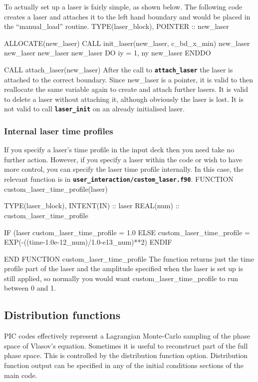 \documentclass[12pt,a4paper]{article}
\newcommand{\inlinecode}[1]{{\color{warwickred} \bf\texttt{#1}}}
\newenvironment{boxverbatim}{\lboxverbatim{none}}{\endlboxverbatim}
\begin{document}
To actually set up a laser is fairly simple, as shown below. The following
code creates a laser and attaches it to the left hand boundary and would
be placed in the ``manual\_load'' routine.
\begin{boxverbatim}
  TYPE(laser_block), POINTER :: new_laser

  ALLOCATE(new_laser)
  CALL init_laser(new_laser, c_bd_x_min)
  new_laser%
  new_laser%
  new_laser%
  new_laser%
  DO iy = 1, ny
    new_laser%
  ENDDO

  CALL attach_laser(new_laser)
\end{boxverbatim}
After the call to \inlinecode{attach\_laser} the laser is attached to the
correct boundary. Since new\_laser is a pointer, it is valid to then reallocate
the same variable again to create and attach further lasers. It is valid to
delete a laser without attaching it, although obviously the laser is lost. It
is not valid to call \inlinecode{laser\_init} on an already initialised laser.

\subsubsection{Internal laser time profiles}
If you specify a laser's time profile in the input deck then you need take no
further action. However, if you specify a laser within the code or wish to
have more control, you can specify the laser time profile internally. In this
case, the relevant function is in
\inlinecode{user\_interaction/custom\_laser.f90}.
\begin{boxverbatim}
FUNCTION custom_laser_time_profile(laser)

  TYPE(laser_block), INTENT(IN) :: laser
  REAL(num) :: custom_laser_time_profile

  IF (laser%
    custom_laser_time_profile = 1.0
  ELSE
    custom_laser_time_profile = EXP(-((time-1.0e-12_num)/1.0-e13_num)**2)
  ENDIF

END FUNCTION custom_laser_time_profile
\end{boxverbatim}
The function returns just the time profile part of the laser and the
amplitude specified when the laser is set up is still applied, so normally you
would want custom\_laser\_time\_profile to run between 0 and 1.

\subsection{Distribution functions}
PIC codes effectively represent a Lagrangian Monte-Carlo sampling of the phase
space of Vlasov's equation. Sometimes it is useful to reconstruct part of the
full phase space. This is controlled by the distribution function option.
Distribution function output can be specified in any of the initial conditions
sections of the main code.
\end{document}
